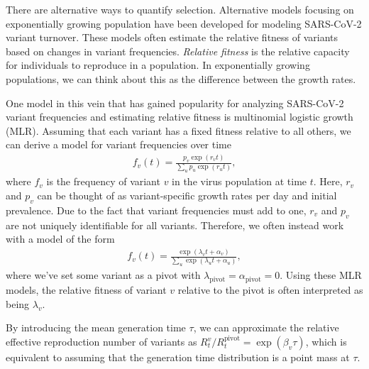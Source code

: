 There are alternative ways to quantify selection.
Alternative models focusing on exponentially growing population have been developed for modeling SARS-CoV-2 variant turnover.
These models often estimate the relative fitness of variants based on changes in variant frequencies.
\emph{Relative fitness} is the relative capacity for individuals to reproduce in a population.
In exponentially growing populations, we can think about this as the difference between the growth rates.

One model in this vein that has gained popularity for analyzing SARS-CoV-2 variant frequencies and estimating relative fitness is multinomial logistic growth (MLR).
Assuming that each variant has a fixed fitness relative to all others, we can derive a model for variant frequencies over time
\begin{align}
f_{v}(t) = \frac{p_{v}\exp(r_{v}t)}{\sum_{u} p_{u} \exp(r_{u}t)},
\end{align}
where $f_{v}$ is the frequency of variant $v$ in the virus population at time $t$.
Here, $r_{v}$ and $p_{v}$ can be thought of as variant-specific growth rates per day and initial prevalence.
Due to the fact that variant frequencies must add to one, $r_{v}$ and $p_{v}$ are not uniquely identifiable for all variants.
Therefore, we often instead work with a model of the form
\begin{align}
f_{v}(t) = \frac{\exp(\lambda_{v} t + \alpha_{v})}{\sum_{u} \exp(\lambda_{u} t + \alpha_{u})},
\end{align}
where we've set some variant as a pivot with $\lambda_{\text{pivot}} = \alpha_{\text{pivot}}=0$.
Using these MLR models, the relative fitness of variant $v$ relative to the pivot is often interpreted as being $\lambda_{v}$.

By introducing the mean generation time $\tau$, we can approximate the relative effective reproduction number of variants as $R_{t}^{v} / R_{t}^{\text{pivot}} = \exp(\beta_{v}\tau)$, which is equivalent to assuming that the generation time distribution is a point mass at $\tau$.

